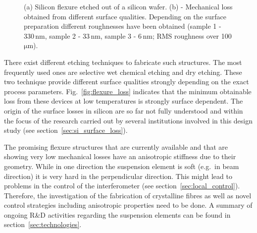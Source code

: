 \begin{figure}[!h]
\begin{center}
\end{center}
\caption{(a) Silicon flexure etched out of a silicon wafer. (b) - Mechanical loss obtained from different surface qualities. Depending on the surface preparation different roughnesses have been obtained (sample 1 - 330\,nm, sample 2 - 33\,nm, sample 3 - 6\,nm; RMS roughness over 100\,$\mathrm{\mu m}$).}
\end{figure}

There exist different etching techniques to fabricate such structures. The most frequently used ones are selective wet chemical etching and dry etching. These two technique provide different surface qualities strongly depending on the exact process parameters. Fig.~\ref{fig:flexure_loss} indicates that the minimum obtainable loss from these devices at low temperatures is strongly surface dependent. The origin of the surface losses in silicon are so far not fully understood and within the focus of the research carried out by several institutions involved in this design study (see section~\ref{sec:si_surface_loss}).

The promising flexure structures that are currently available and that are showing very low mechanical losses have an anisotropic stiffness due to their geometry. While in one direction the suspension element is soft (e.g.\ in beam direction) it is very hard in the perpendicular direction. This might lead to problems in the control of the interferometer (see section~\ref{sec:local_control}). Therefore, the investigation of the fabrication of crystalline fibres as well as novel control strategies including anisotropic properties need to be done. A summary of ongoing R\&D activities regarding the suspension elements can be found in section~\ref{sec:technologies}.
\FloatBarrier



